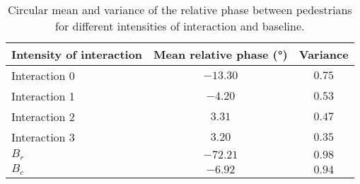 \begin{table}
\centering
\caption{Circular mean and variance of the relative phase between pedestrians for different intensities of interaction and baseline.}
\label{tab:relative_phase}
\begin{tabular}{lcc}
\toprule
Intensity of interaction & Mean relative phase (°) & Variance \\
\midrule
Interaction 0 & $-13.30$ & $0.75$ \\
Interaction 1 & $-4.20$ & $0.53$ \\
Interaction 2 & $3.31$ & $0.47$ \\
Interaction 3 & $3.20$ & $0.35$ \\
\midrule
$B_r$ & $-72.21$ & $0.98$ \\
$B_c$ & $-6.92$ & $0.94$ \\
\bottomrule
\end{tabular}
\end{table}
